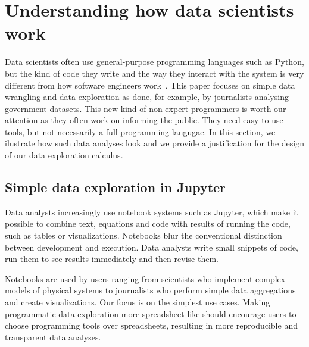 \documentclass[english,crc,references=cleveref]{programming}
\theoremstyle{plain}
\theoremstyle{definition}
\begin{document}

\section{Understanding how data scientists work}
\label{sec:background}

Data scientists often use general-purpose programming languages such as Python, but the kind of
code they write and the way they interact with the system is very different from how software
engineers work~\cite{workflow}. This paper focuses on simple data wrangling and data exploration as
done, for example, by journalists analysing government datasets. This new kind of non-expert
programmers is worth our attention as they often work on informing the public. They need easy-to-use
tools, but not necessarily a full programming langugae. In this section, we ilustrate how such
data analyses look and we provide a justification for the design of our data exploration calculus.


\subsection{Simple data exploration in Jupyter}
\label{sec:background-jupyter}

Data analysts increasingly use notebook systems such as Jupyter, which make it possible to
combine text, equations and code with results of running the code, such as tables or visualizations.
Notebooks blur the conventional distinction between development and execution. Data analysts write
small snippets of code, run them to see results immediately and then revise them.

Notebooks are used by users ranging from scientists who implement complex models of physical
systems to journalists who perform simple data aggregations and create visualizations. Our
focus is on the simplest use cases. Making programmatic data exploration more
spreadsheet-like should encourage users to choose programming tools over spreadsheets, resulting
in more reproducible and transparent data analyses.
\end{document}

